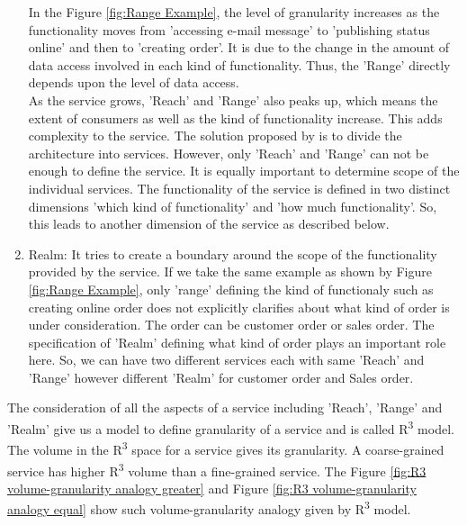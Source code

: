 \begin{enumerate}
In the Figure \ref{fig:Range Example}, the level of granularity increases as the functionality moves from 'accessing e-mail message' to 'publishing status online' and then to 'creating order'. It is due to the change in the amount of data access involved in each kind of functionality. Thus, the 'Range' directly depends upon the level of data access.
\\
As the service grows, 'Reach' and 'Range' also peaks up, which means the extent of consumers as well as the kind of functionality increase. This adds complexity to the service. The solution proposed by \cite{Cockburn:2001aa} is to divide the architecture into services. However, only 'Reach' and 'Range' can not be enough to define the service. It is equally important to determine scope of the individual services. The functionality of the service is defined in two distinct dimensions 'which kind of functionality' and 'how much functionality'. So, this leads to another dimension of the service as described below.
\cite{Keen:2015aa, Weill:1998aa, Pierre-Reldin:2007aa}
\\
\item Realm: It tries to create a boundary around the scope of the functionality provided by the service. If we take the same example as shown by Figure \ref{fig:Range Example}, only 'range' defining the kind of functionaly such as creating online order does not explicitly clarifies about what kind of order is under consideration. The order can be customer order or sales order. The specification of 'Realm' defining what kind of order plays an important role here. So, we can have two different services each with same 'Reach' and 'Range' however different 'Realm' for customer order and Sales order.  \cite{Keen:2015aa, Weill:1998aa, Pierre-Reldin:2007aa}
\end{enumerate}

The consideration of all the aspects of a service including 'Reach', 'Range' and 'Realm' give us a model to define granularity of a service and is called R\textsuperscript{3} model. The volume in the R\textsuperscript{3} space for a service gives its granularity. A coarse-grained service has higher R\textsuperscript{3} volume than a fine-grained service. The Figure \ref{fig:R3 volume-granularity analogy greater}  and Figure \ref{fig:R3 volume-granularity analogy equal} show such volume-granularity analogy given by R\textsuperscript{3} model. \cite{Keen:2015aa, Weill:1998aa, Pierre-Reldin:2007aa}

